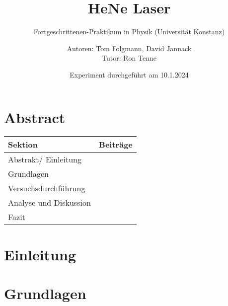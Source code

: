 \documentclass[
    oneside, 
    footinclude=off, 
    captions=tableheading, 
    DIV=12;usenames,
    dvipsnames
]{scrartcl}
\begin{document}
    \title{HeNe Laser}
    \subtitle{Fortgeschrittenen-Praktikum in Physik (Universität Konstanz)}
    \author{Autoren: Tom Folgmann, David Jannack \\ \large{Tutor: Ron Tenne}}
    \date{Experiment durchgeführt am 10.1.2024}
    \maketitle
    \thispagestyle{empty}
    
    \section*{Abstract}
        

    \vspace{2cm}
    \begin{table}[H]
        \centering
            \begin{tabular}{l|l}
            Sektion & Beiträge \\\hline\hline
            Abstrakt/ Einleitung & \\
            Grundlagen & \\
            Versuchsdurchführung & \\
            Analyse und Diskussion & \\
            Fazit &
        \end{tabular}
    \end{table}

    \newpage


    \tableofcontents
    \thispagestyle{empty}	
    \newpage
    \setcounter{page}{1}


\newpage
\section{Einleitung}
    

\newpage
\section{Grundlagen}
    
\end{document}
